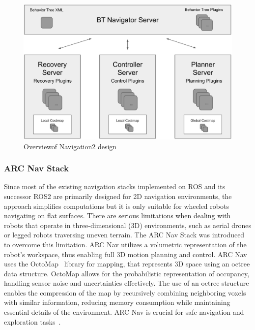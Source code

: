 \vspace{0.7em}
\begin{figure}[H]
    \centering
    \includegraphics[width=4.5in ]{pics/nav2.png}
    \caption[Overview of Navigation2 design]{Overviewof Navigation2 design~\cite{macenski2020marathon2}}\label{nav2}
\end{figure}


\subsubsection{ARC Nav Stack}
Since most of the existing navigation stacks implemented on ROS and its successor ROS2 are primarily designed for 2D navigation
environments, the approach simplifies computations but it is only suitable for wheeled robots navigating on flat surfaces. There
are serious limitations when dealing with robots that operate in three-dimensional (3D) environments, such as aerial drones or legged
robots traversing uneven terrain. The ARC Nav Stack was introduced~\cite{vishwas2021arc} to overcome this limitation. ARC Nav
utilizes a volumetric representation of the robot's workspace, thus enabling full 3D motion planning and control. ARC Nav uses the OctoMap~\cite{hornung2013octomap}
library for mapping, that represents 3D space using an octree data structure. OctoMap allows for the probabilistic
representation of occupancy, handling sensor noise and uncertainties effectively. The use of an octree structure enables
the compression of the map by recursively combining neighboring voxels with similar information, reducing memory
consumption while maintaining essential details of the environment. ARC Nav is crucial for safe navigation and exploration tasks~\cite{vishwas2021arc}.


